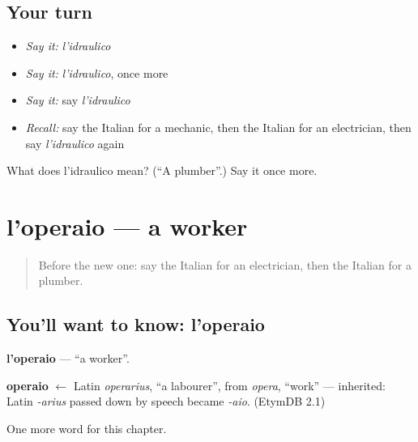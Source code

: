 \subsection*{Your turn}
\begin{itemize}
\raggedright
  \item \emph{Say it:} \emph{l'idraulico}
  \item \emph{Say it:} \emph{l'idraulico}, once more
  \item \emph{Say it:} say \emph{l'idraulico}
  \item \emph{Recall:} say the Italian for a mechanic, then the Italian for an electrician, then say \emph{l'idraulico} again
\end{itemize}

\begin{tcolorbox}[breakable,colback=teal!4,colframe=teal!35!black,title={Before you move on}]
What does l'idraulico mean? (\textquotedblleft{}A plumber\textquotedblright{}.) Say it once more.
\end{tcolorbox}
\section[l'operaio]{l'operaio — a worker}

\label{lesson:IT-C163-operaio}



\begin{quote}
Before the new one: say the Italian for an electrician, then the Italian for a plumber.
\end{quote}

\subsection*{You'll want to know: l'operaio}
\textbf{l'operaio} — \textquotedblleft{}a worker\textquotedblright{}.

\begin{cousinweb}
\textbf{operaio} $\leftarrow$ Latin \emph{operarius}, \textquotedblleft{}a labourer\textquotedblright{}, from \emph{opera}, \textquotedblleft{}work\textquotedblright{} — inherited: Latin \emph{-arius} passed down by speech became \emph{-aio}. (EtymDB 2.1)
\end{cousinweb}

\begin{grammarlens}[title={What you've built}]
One more word for this chapter.
\end{grammarlens}

